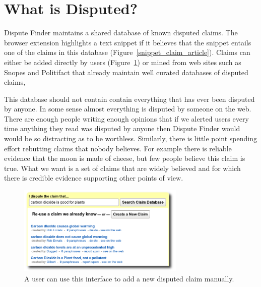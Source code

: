 \documentclass{www2010-submission}
\newcommand{\todo}[1]{}
\begin{document}
\todo{Improve the paraphraser UI so it shows users what pages are making the claim}
\todo{Improve the ``see examples on the web'' UI to it shows the pages that were found with the activists training work}
\todo{Provide a customized RSS reader and search engine that does dispute tracking. - future work?}
\todo{Should we explicitly list what we think are our key contributions?}


\section{What is Disputed?}
\label{sec:disputed}

Dispute Finder maintains a shared database of known disputed claims. The browser extension highlights a text snippet if it believes that the snippet entails one of the claims in this database (Figure~\ref{snippet_claim_article}). Claims can either be added directly by users (Figure~\ref{add_claim}) or mined from web sites such as Snopes and Politifact that already maintain well curated databases of disputed claims, 

This database should not contain contain everything that has ever been disputed by anyone. In some sense almost everything is disputed by someone on the web. There are enough people writing enough opinions that if we alerted users every time anything they read was disputed by anyone then Dispute Finder would would be so distracting as to be worthless. Similarly, there is little point spending effort rebutting claims that nobody believes. For example there is reliable evidence that the moon is made of cheese, but few people believe this claim is true. What we want is a set of claims that are widely believed and for which there is credible evidence supporting other points of view.

\begin{figure}[tb]
	\begin{center}
	\includegraphics[width=8cm]{pictures/add_claim_list.png}
	\caption{A user can use this interface to add a new disputed claim manually.}
	\label{add_claim}
	\end{center}
\end{figure}
\end{document}
